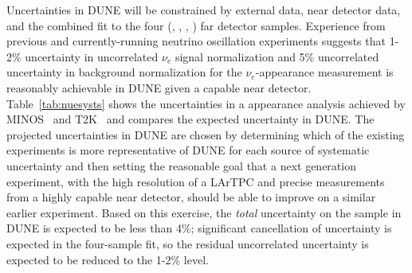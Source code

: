 Uncertainties in DUNE
will be constrained by external data, near detector data, and the combined
fit to the four (\nue, \anue, \numu, \anumu) far detector samples.  
Experience from previous and currently-running neutrino oscillation 
experiments suggests that 1-2\% uncertainty in uncorrelated $\nu_e$
signal normalization and 5\%
uncorrelated uncertainty in background normalization for the 
$\nu_e$-appearance measurement
is reasonably achievable in DUNE given a capable near detector.
Table~\ref{tab:nuesysts} shows the uncertainties in a \nue appearance
analysis achieved by MINOS~\cite{Adamson:2013ue} 
and T2K~\cite{Abe:2013hdq} and compares the 
expected uncertainty in
DUNE. The projected uncertainties in DUNE are chosen by determining which
of the existing experiments is more representative of DUNE for each source
of systematic uncertainty and then setting the reasonable goal that a next
generation experiment, with the high resolution of a LArTPC and precise measurements
from a highly capable near detector, should be able to improve on a similar earlier experiment.
Based on this exercise, the \emph{total} uncertainty on the \nue sample in
DUNE is expected to be less than 4\%; significant cancellation of uncertainty
is expected in the four-sample fit, so the residual uncorrelated uncertainty 
is expected to be reduced to the 1-2\% level.

